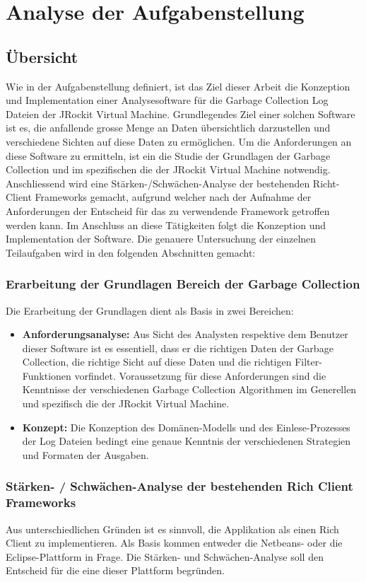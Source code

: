 \chapter{Analyse der Aufgabenstellung}\label{analyse_aufgabenstellung}
\section{Übersicht}
Wie in der Aufgabenstellung definiert, ist das Ziel dieser Arbeit die Konzeption und Implementation einer Analysesoftware für die Garbage Collection Log Dateien der JRockit Virtual Machine. Grundlegendes Ziel einer solchen Software ist es, die anfallende grosse Menge an Daten übersichtlich darzustellen und verschiedene Sichten auf diese Daten zu ermöglichen. Um die Anforderungen an diese Software zu ermitteln, ist ein die Studie der Grundlagen der Garbage Collection und im spezifischen die der JRockit Virtual Machine notwendig. Anschliessend wird eine Stärken-/Schwächen-Analyse der bestehenden Richt-Client Frameworks gemacht, aufgrund welcher nach der Aufnahme der Anforderungen der Entscheid für das zu verwendende Framework getroffen werden kann. Im Anschluss an diese Tätigkeiten folgt die Konzeption und Implementation der Software. Die genauere Untersuchung der einzelnen Teilaufgaben wird in den folgenden Abschnitten gemacht:

\subsection{Erarbeitung der Grundlagen Bereich der Garbage Collection}
Die Erarbeitung der Grundlagen dient als Basis in zwei Bereichen:
\begin{itemize}
	\item \textbf{Anforderungsanalyse:} Aus Sicht des Analysten respektive dem Benutzer dieser Software ist es essentiell, dass er die richtigen Daten der Garbage Collection, die richtige Sicht auf diese Daten und die richtigen Filter-Funktionen vorfindet. Voraussetzung für diese Anforderungen sind die Kenntnisse der verschiedenen Garbage Collection Algorithmen im Generellen und spezifisch die der JRockit Virtual Machine. 
	\item \textbf{Konzept: } Die Konzeption des Domänen-Modells und des Einlese-Prozesses der Log Dateien bedingt eine genaue Kenntnis der verschiedenen Strategien und Formaten der Ausgaben.
\end{itemize}

\subsection{Stärken- / Schwächen-Analyse der bestehenden Rich Client Frameworks}
Aus unterschiedlichen Gründen ist es sinnvoll, die Applikation als einen Rich Client zu implementieren. Als Basis kommen entweder die Netbeans- oder die Eclipse-Plattform in Frage. Die Stärken- und Schwächen-Analyse soll den Entscheid für die eine dieser Plattform begründen.

